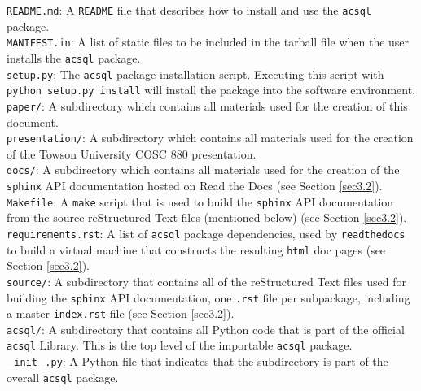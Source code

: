 \documentclass[10pt,journal,compsoc]{IEEEtran}
\begin{document}
\noindent\texttt{README.md}: A \texttt{README} file that describes how to install and use the \texttt{acsql} package.\\

\noindent\texttt{MANIFEST.in}: A list of static files to be included in the tarball file when the user installs the \texttt{acsql} package.\\

\noindent\texttt{setup.py}: The \texttt{acsql} package installation script.  Executing this script with \texttt{python setup.py install} will install the package into the software environment.\\

\noindent\texttt{paper/}: A subdirectory which contains all materials used for the creation of this document.\\

\noindent\texttt{presentation/}: A subdirectory which contains all materials used for the creation of the Towson University COSC 880 presentation.\\

\noindent\texttt{docs/}: A subdirectory which contains all materials used for the creation of the \texttt{sphinx} API documentation hosted on Read the Docs (see Section \ref{sec3.2}).\\

\noindent\texttt{Makefile}: A \texttt{make} script that is used to build the \texttt{sphinx} API documentation from the source reStructured Text files (mentioned below) (see Section \ref{sec3.2}).\\

\noindent\texttt{requirements.rst}: A list of \texttt{acsql} package dependencies, used by \texttt{readthedocs} to build a virtual machine that constructs the resulting \texttt{html} doc pages
(see Section \ref{sec3.2}).\\

\noindent\texttt{source/}: A subdirectory that contains all of the reStructured Text files used for building the \texttt{sphinx} API documentation, one \texttt{.rst} file per subpackage, including
a master \texttt{index.rst} file (see Section \ref{sec3.2}).\\

\noindent\texttt{acsql/}: A subdirectory that contains all Python code that is part of the official \texttt{acsql} Library. This is the top level of the importable \texttt{acsql} package.\\

\noindent\texttt{$\_$$\_$init$\_$$\_$.py}: A Python file that indicates that the subdirectory is part of the overall \texttt{acsql} package.\\
\end{document}
